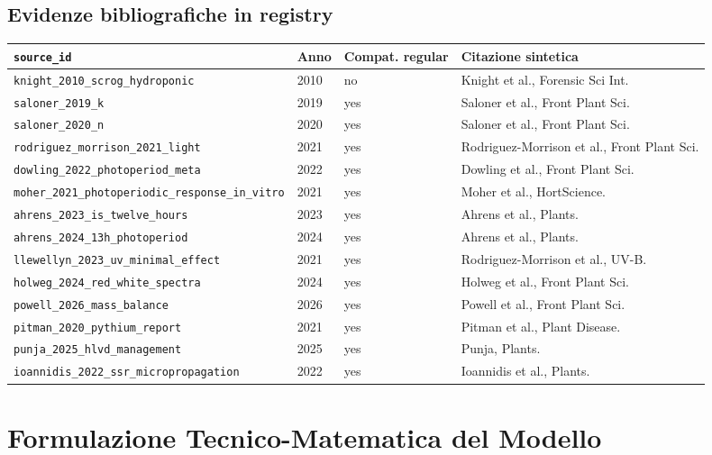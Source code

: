 ﻿\documentclass[11pt,a4paper]{report}
\begin{document}
\section{Evidenze bibliografiche in registry}
\begin{longtable}{@{}p{3.7cm}p{0.9cm}p{2.3cm}p{7.0cm}@{}}
\toprule
\texttt{source\_id} & Anno & Compat. regular & Citazione sintetica \\ \midrule
\texttt{knight\_2010\_scrog\_hydroponic} & 2010 & no & Knight et al., Forensic Sci Int. \\
\texttt{saloner\_2019\_k} & 2019 & yes & Saloner et al., Front Plant Sci. \\
\texttt{saloner\_2020\_n} & 2020 & yes & Saloner et al., Front Plant Sci. \\
\texttt{rodriguez\_morrison\_2021\_light} & 2021 & yes & Rodriguez-Morrison et al., Front Plant Sci. \\
\texttt{dowling\_2022\_photoperiod\_meta} & 2022 & yes & Dowling et al., Front Plant Sci. \\
\texttt{moher\_2021\_photoperiodic\_response\_in\_vitro} & 2021 & yes & Moher et al., HortScience. \\
\texttt{ahrens\_2023\_is\_twelve\_hours} & 2023 & yes & Ahrens et al., Plants. \\
\texttt{ahrens\_2024\_13h\_photoperiod} & 2024 & yes & Ahrens et al., Plants. \\
\texttt{llewellyn\_2023\_uv\_minimal\_effect} & 2021 & yes & Rodriguez-Morrison et al., UV-B. \\
\texttt{holweg\_2024\_red\_white\_spectra} & 2024 & yes & Holweg et al., Front Plant Sci. \\
\texttt{powell\_2026\_mass\_balance} & 2026 & yes & Powell et al., Front Plant Sci. \\
\texttt{pitman\_2020\_pythium\_report} & 2021 & yes & Pitman et al., Plant Disease. \\
\texttt{punja\_2025\_hlvd\_management} & 2025 & yes & Punja, Plants. \\
\texttt{ioannidis\_2022\_ssr\_micropropagation} & 2022 & yes & Ioannidis et al., Plants. \\
\bottomrule
\end{longtable}

\newpage
\chapter{Formulazione Tecnico-Matematica del Modello}
\end{document}
